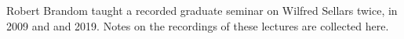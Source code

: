 Robert Brandom taught a recorded graduate seminar on Wilfred Sellars twice, in 2009 and and 2019. Notes on the recordings of these lectures are collected here.
